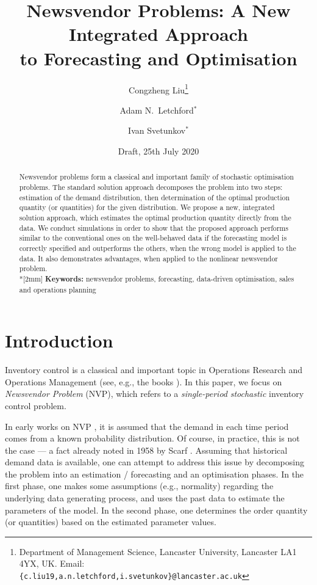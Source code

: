 \documentclass{article}
\title{Newsvendor Problems: A New Integrated Approach\\ to Forecasting and Optimisation}
\author{Congzheng Liu\thanks{Department of Management Science,
Lancaster University, Lancaster LA1 4YX, UK.
Email: {\tt \{c.liu19,a.n.letchford,i.svetunkov\}@lancaster.ac.uk}}
\and Adam N.\ Letchford$^*$ \and Ivan Svetunkov$^*$} %
\date{Draft, 25th July 2020}
\begin{document}
\maketitle

\begin{abstract}
Newsvendor problems form a classical and important family of stochastic optimisation problems. The standard solution approach decomposes the problem into two steps: estimation of the demand distribution, then determination of the optimal production quantity (or quantities) for the given distribution. We propose a new, integrated solution approach, which estimates the optimal production quantity directly from the data. We conduct simulations in order to show that the proposed approach performs similar to the conventional ones on the well-behaved data if the forecasting model is correctly specified and outperforms the others, when the wrong model is applied to the data. It also demonstrates advantages, when applied to the nonlinear newsvendor problem.%
\\*[2mm]
{\bf Keywords:} newsvendor problems, forecasting, data-driven optimisation, sales and operations planning
\end{abstract}


\section{Introduction}

Inventory control is a classical and important topic in Operations Research and Operations Management (see, e.g., the books \cite{Po02,SPP98,Zi00}). In this paper, we focus on \emph{Newsvendor Problem} (NVP), which refers to a \emph{single-period} \emph{stochastic} inventory control problem.

In early works on NVP \cite{AHM51,MK51}, it is assumed that the demand in each time period comes from a known probability distribution. Of course, in practice, this is not the case --- a fact already noted in 1958 by Scarf \cite{Sc58}. Assuming that historical demand data is available, one can attempt to address this issue by decomposing the problem into an estimation / forecasting and an optimisation phases.
In the first phase, one makes some assumptions (e.g., normality) regarding the underlying data generating process, and uses the past data to estimate the parameters of the model.
In the second phase, one determines the order quantity (or quantities) based on the estimated parameter values.
\end{document}
